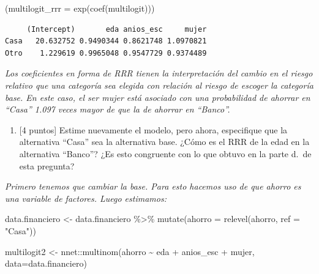 \documentclass[
  letterpaper,
  DIV=11,
  numbers=noendperiod]{scrartcl}
\newenvironment{Shaded}{\begin{snugshade}}{\end{snugshade}}
\newcommand{\AttributeTok}[1]{\textcolor[rgb]{0.40,0.45,0.13}{#1}}
\newcommand{\FunctionTok}[1]{\textcolor[rgb]{0.28,0.35,0.67}{#1}}
\newcommand{\NormalTok}[1]{\textcolor[rgb]{0.00,0.23,0.31}{#1}}
\newcommand{\OtherTok}[1]{\textcolor[rgb]{0.00,0.23,0.31}{#1}}
\newcommand{\SpecialCharTok}[1]{\textcolor[rgb]{0.37,0.37,0.37}{#1}}
\newcommand{\StringTok}[1]{\textcolor[rgb]{0.13,0.47,0.30}{#1}}
\providecommand{\tightlist}{%
  \setlength{\itemsep}{0pt}\setlength{\parskip}{0pt}}\usepackage{longtable,booktabs,array}
\begin{document}
\begin{Shaded}
\begin{Highlighting}[]
\NormalTok{(}\AttributeTok{multilogit\_rrr =} \FunctionTok{exp}\NormalTok{(}\FunctionTok{coef}\NormalTok{(multilogit)))}
\end{Highlighting}
\end{Shaded}

\begin{verbatim}
     (Intercept)       eda anios_esc     mujer
Casa   20.632752 0.9490344 0.8621748 1.0970821
Otro    1.229619 0.9965048 0.9547729 0.9374489
\end{verbatim}

\emph{Los coeficientes en forma de RRR tienen la interpretación del
cambio en el riesgo relativo que una categoría sea elegida con relación
al riesgo de escoger la categoría base. En este caso, el ser mujer está
asociado con una probabilidad de ahorrar en ``Casa'' 1.097 veces mayor
de que la de ahorrar en ``Banco''.}

\begin{enumerate}
\def\labelenumi{\alph{enumi}.}
\tightlist
\item
  {[}4 puntos{]} Estime nuevamente el modelo, pero ahora, especifique
  que la alternativa ``Casa'' sea la alternativa base. ¿Cómo es el RRR
  de la edad en la alternativa ``Banco''? ¿Es esto congruente con lo que
  obtuvo en la parte d.~de esta pregunta?
\end{enumerate}

\emph{Primero tenemos que cambiar la base. Para esto hacemos uso de que
ahorro es una variable de factores. Luego estimamos:}

\begin{Shaded}
\begin{Highlighting}[]
\NormalTok{data.financiero }\OtherTok{\textless{}{-}}\NormalTok{ data.financiero }\SpecialCharTok{\%\textgreater{}\%} 
  \FunctionTok{mutate}\NormalTok{(}\AttributeTok{ahorro =} \FunctionTok{relevel}\NormalTok{(ahorro, }\AttributeTok{ref =} \StringTok{"Casa"}\NormalTok{))}

\NormalTok{multilogit2 }\OtherTok{\textless{}{-}}\NormalTok{ nnet}\SpecialCharTok{::}\FunctionTok{multinom}\NormalTok{(ahorro }\SpecialCharTok{\textasciitilde{}}\NormalTok{ eda }\SpecialCharTok{+}\NormalTok{ anios\_esc }\SpecialCharTok{+}\NormalTok{ mujer,}
                              \AttributeTok{data=}\NormalTok{data.financiero)}
\end{Highlighting}
\end{Shaded}
\end{document}
